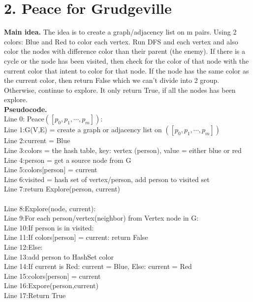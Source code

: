 \documentclass[11pt]{article}
\newcommand{\tab}{\hspace*{2em}}
\begin{document}
\newpage
\section*{2.  Peace for Grudgeville}
\noindent
\textbf{Main idea.}
The idea is to create a graph/adjacency list on m pairs. Using 2 colors: Blue and Red to color each vertex. Run DFS and each vertex and also color the nodes with difference color than their parent (the enemy). If there is a cycle or the node has been visited, then check for the color of that node with the current color that intent to color for that node. If the node has the same color as the current color, then return False which we can't divide into 2 group. Otherwise, continue to explore. It only return True, if all the nodes has been explore.\\

\noindent
\textbf{Pseudocode.}\\
Line 0: Peace$([p_0,p_1,\cdots, p_m])$:\\
Line 1:\tab G(V,E) = create a graph or adjacency list on $([p_0,p_1,\cdots, p_m])$\\
Line 2:\tab current = Blue\\%
Line 3:\tab colors = the hash table, key: vertex (person), value = either blue or red\\
Line 4:\tab person = get a source node from G\\
Line 5:\tab colors[person] = current\\
Line 6:\tab visited = hash set of vertex/person, add person to visited set\\
Line 7:\tab return Explore(person, current)\\
\\
Line 8:\tab Explore(node, current):\\
Line 9:\tab\tab For each person/vertex(neighbor) from Vertex node in G: \\
Line 10:\tab\tab\tab If person is in visited:\\
Line 11:\tab\tab\tab\tab If colors[person] = current: return False\\
Line 12:\tab\tab\tab Else:\\
Line 13:\tab\tab\tab\tab add person to HashSet color\\
Line 14:\tab\tab\tab\tab If current is Red: current = Blue, Else: current = Red\\
Line 15:\tab\tab\tab\tab colors[person] = current\\
Line 16:\tab\tab\tab\tab Expore(person,current)\\
Line 17:\tab\tab Return True
\end{document}
